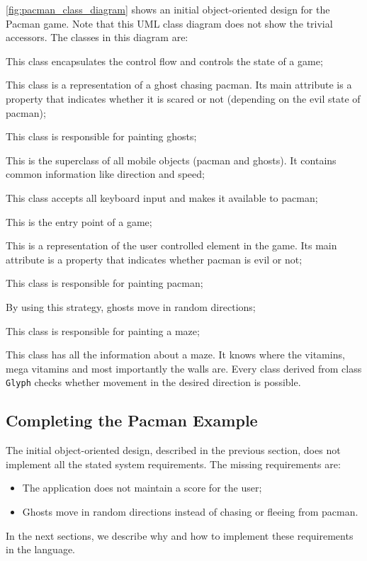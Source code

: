 %
\autoref{fig:pacman_class_diagram} shows an initial object-oriented design for the Pacman game.
Note that this UML class diagram does not show the trivial accessors.
The classes in this diagram are:
\begin{description}[noitemsep,style=sameline,leftmargin=32mm]
  \item [Game] This class encapsulates the control flow and controls the state of a game;
  \item [Ghost] This class is a representation of a ghost chasing pacman.
    Its main attribute is a property that indicates whether it is scared or not (depending on the evil state of pacman);
  \item [GhostView] This class is responsible for painting ghosts;
  \item [Glyph] This is the superclass of all mobile objects (pacman and ghosts).
    It contains common information like direction and speed;
  \item [Keyboard] This class accepts all keyboard input and makes it available to pacman;
  \item [Main] This is the entry point of a game;
  \item [Pacman] This is a representation of the user controlled element in the game.
    Its main attribute is a property that indicates whether pacman is evil or not;
  \item [PacmanView] This class is responsible for painting pacman;
  \item [RandomStrategy] By using this strategy, ghosts move in random directions;
  \item [View] This class is responsible for painting a maze;
  \item [World] This class has all the information about a maze.
    It knows where the vitamins, mega vitamins and most importantly the walls are.
    Every class derived from class \lstinline|Glyph| checks whether movement in the desired direction is possible.
\end{description}

\subsection{Completing the Pacman Example}

The initial object-oriented design, described in the previous section, does not implement all the stated system requirements.
The missing requirements are:
\begin{itemize}[noitemsep]
  \samepage
  \item The application does not maintain a score for the user;
  \item Ghosts move in random directions instead of chasing or fleeing from pacman.
\end{itemize}
In the next sections, we describe why and how to implement these requirements in the \Compose* language.

